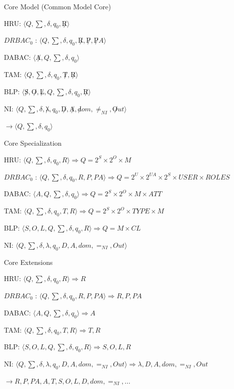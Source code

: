 \documentclass[a4paper]{article}
\begin{document}
\begin{multicols}{3}
    Core Model (Common Model Core)
    \begin{itemize*}
        \item HRU: $⟨ Q, \sum , \delta, q_0  , \not R ⟩$
        \item $DRBAC_0$ : $⟨ Q, \sum , \delta, q_0  , \not R, \not P, \not PA ⟩$
        \item DABAC: $⟨ \not A , Q ,\sum , \delta, q_0  ⟩$
        \item TAM: $⟨ Q , \sum , \delta, q_0  , \not T, \not R ⟩$
        \item BLP: $⟨ \not S, \not O, \not L, Q , \sum , \delta, q_0  , \not R ⟩$
        \item NI: $⟨ Q , \sum , \delta, \not \lambda ,q_0  , \not D, \not A, \not dom, \not =_{NI} , \not Out ⟩$
        \item $\rightarrow  ⟨ Q ,\sum , \delta, q_0  ⟩$
    \end{itemize*}

    Core Specialization
    \begin{itemize*}
        \item HRU: $⟨ Q, \sum , \delta, q_0  , R ⟩ \Rightarrow Q = 2^S \times  2^O \times M$
        \item $DRBAC_0$ : $⟨ Q, \sum , \delta, q_0  , R, P, PA ⟩ \Rightarrow Q = 2^U\times 2^{UA}\times 2^S \times  USER \times  ROLES$
        \item DABAC: $⟨ A , Q ,\sum , \delta, q_0  ⟩ \Rightarrow Q = 2^S\times 2^O \times M\times ATT$
        \item TAM: $⟨ Q , \sum , \delta, q_0  , T, R ⟩ \Rightarrow Q = 2^S\times 2^O\times TYPE \times M$
        \item BLP: $⟨ S, O, L, Q , \sum , \delta, q_0  , R ⟩ \Rightarrow Q = M \times CL$
        \item NI: $⟨ Q , \sum , \delta, \lambda ,q_0  , D, A, dom, =_{NI} , Out ⟩$
    \end{itemize*}

    Core Extensions
    \begin{itemize*}
        \item HRU: $⟨ Q, \sum , \delta, q_0  , R ⟩ \Rightarrow R$
        \item $DRBAC_0$ : $⟨ Q, \sum , \delta, q_0  , R, P, PA ⟩ \Rightarrow R,P,PA$
        \item DABAC: $⟨ A , Q ,\sum , \delta, q_0  ⟩ \Rightarrow A$
        \item TAM: $⟨ Q , \sum , \delta, q_0  , T, R ⟩ \Rightarrow T,R$
        \item BLP: $⟨ S, O, L, Q , \sum , \delta, q_0  , R ⟩ \Rightarrow S,O,L,R$
        \item NI: $⟨ Q , \sum , \delta, \lambda ,q_0  , D, A, dom, =_{NI} , Out ⟩ \Rightarrow \lambda,D,A,dom,=_{NI},Out$
        \item $\rightarrow R, P, PA, A , T , S , O , L , D , dom , =_{NI} , ...$
    \end{itemize*}


\end{multicols}
\end{document}
